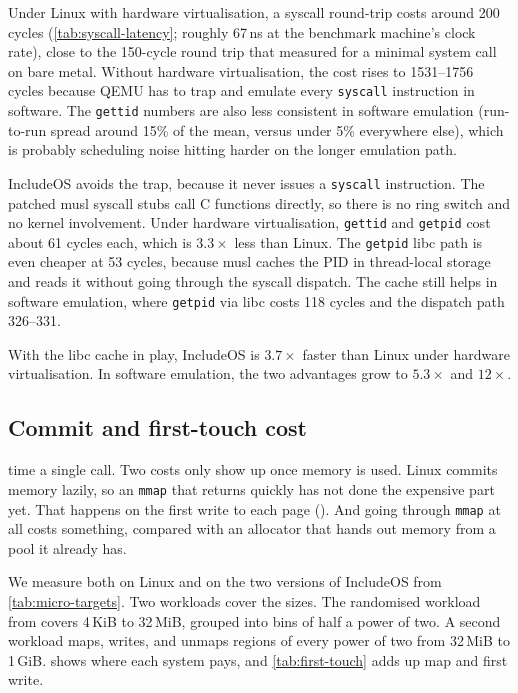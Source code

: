 \documentclass[12pt]{report}
\newcommand{\fullref}[1]{\Cref{#1}}
\renewcommand{\_}{\origunderscore\allowbreak}
\begin{document}
Under Linux with hardware virtualisation, a syscall round-trip costs around 200 cycles (\cref{tab:syscall-latency}; roughly 67\,ns at the benchmark machine's clock rate), close to the 150-cycle round trip that \textcite{soares2010flexsc} measured for a minimal system call on bare metal. Without hardware virtualisation, the cost rises to 1531--1756 cycles because QEMU has to trap and emulate every \texttt{syscall} instruction in software. The \texttt{gettid} numbers are also less consistent in software emulation (run-to-run spread around 15\% of the mean, versus under 5\% everywhere else), which is probably scheduling noise hitting harder on the longer emulation path.

IncludeOS avoids the trap, because it never issues a \texttt{syscall} instruction. The patched musl syscall stubs call C functions directly, so there is no ring switch and no kernel involvement. Under hardware virtualisation, \texttt{gettid} and \texttt{getpid} cost about 61 cycles each, which is $3.3{\times}$ less than Linux. The \texttt{getpid} libc path is even cheaper at 53 cycles, because musl caches the PID in thread-local storage and reads it without going through the syscall dispatch. The cache still helps in software emulation, where \texttt{getpid} via libc costs 118 cycles and the dispatch path 326--331.

With the libc cache in play, IncludeOS is $3.7{\times}$ faster than Linux under hardware virtualisation. In software emulation, the two advantages grow to $5.3{\times}$ and $12{\times}$.

\subsection{Commit and first-touch cost}
\label{sec:eval-first-touch}

 time a single call. Two costs only show up once memory is used. Linux commits memory lazily, so an \texttt{mmap} that returns quickly has not done the expensive part yet. That happens on the first write to each page (\fullref{sssec:posix-memory}). And going through \texttt{mmap} at all costs something, compared with an allocator that hands out memory from a pool it already has.

We measure both on Linux and on the two versions of IncludeOS from \cref{tab:micro-targets}. Two workloads cover the sizes. The randomised workload from \fullref{sec:experimental-setup} covers 4\,KiB to 32\,MiB, grouped into bins of half a power of two. A second workload maps, writes, and unmaps regions of every power of two from 32\,MiB to 1\,GiB.  shows where each system pays, and \cref{tab:first-touch} adds up map and first write.
\end{document}
